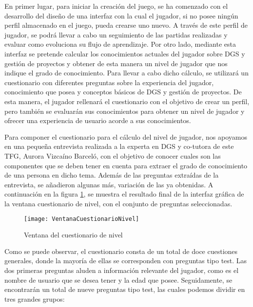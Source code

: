 En primer lugar, para iniciar la creación del juego, se ha comenzado con el desarrollo del diseño de una interfaz con la cual el jugador, si no posee ningún perfil almacenado en el juego, pueda crearse uno nuevo. A través de este perfil de jugador, se podrá llevar a cabo un seguimiento de las partidas realizadas y evaluar como evoluciona su flujo de aprendizaje. Por otro lado, mediante esta interfaz se pretende calcular los conocimientos actuales del jugador sobre DGS y gestión de proyectos y obtener de esta manera un nivel de jugador que nos indique el grado de conocimiento. Para llevar a cabo dicho cálculo, se utilizará un cuestionario con diferentes preguntas sobre la experiencia del jugador, conocimiento que posea y conceptos básicos de DGS y gestión de proyectos. De esta manera, el jugador rellenará el cuestionario con el objetivo de crear un perfil, pero también se evaluarán sus conocimientos para obtener un nivel de jugador y ofrecer una experiencia de usuario acorde a sus conocimientos. 

Para componer el cuestionario para el cálculo del nivel de jugador, nos apoyamos en una pequeña entrevista realizada a la experta en DGS y co-tutora de este TFG, Aurora Vizcaíno Barceló, con el objetivo de conocer cuales son las componentes que se deben tener en cuenta para extraer el grado de conocimiento de una persona en dicho tema. Además de las preguntas extraídas de la entrevista, se añadieron algunas más, variación de las ya obtenidas. A continuación en la figura \ref{fig:VentanaCuestionarioNivel}, se muestra el resultado final de la interfaz gráfica de la ventana cuestionario de nivel, con el conjunto de preguntas seleccionadas.

\begin{figure}[htb]
	\centering
	\texttt{[image: VentanaCuestionarioNivel]}
	\caption[Ventana del cuestionario de nivel]{Ventana del cuestionario de nivel}
	\label{fig:VentanaCuestionarioNivel}
\end{figure}

Como se puede observar, el cuestionario consta de un total de doce cuestiones generales, donde la mayoría de ellas se corresponden con preguntas tipo test. Las dos primeras preguntas aluden a información relevante del jugador, como es el nombre de usuario que se desea tener y la edad que posee. Seguidamente, se encontrarán un total de nueve preguntas tipo test, las cuales podemos dividir en tres grandes grupos:

